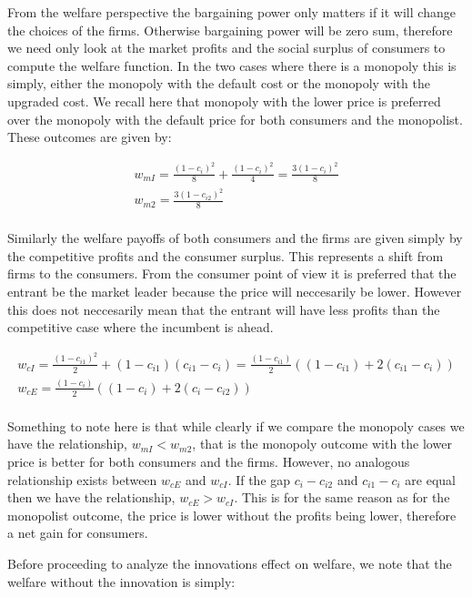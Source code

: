 \documentclass[11pt]{article}
\begin{document}
From the welfare perspective the bargaining power only matters if it will change the choices of the firms. Otherwise bargaining power will be zero sum, therefore we need only look at the market profits and the social surplus of consumers to compute the welfare function. In the two cases where there is a monopoly this is simply, either the monopoly with the default cost or the monopoly with the upgraded cost. We recall here that monopoly with the lower price is preferred over the monopoly with the default price for both consumers and the monopolist. These outcomes are given by:

\begin{align*}
w_{mI} = \frac{(1-c_i)^2}{8} + \frac{(1-c_i)^2}{4}= \frac{3(1-c_i)^2}{8} \\
w_{m2} = \frac{3(1-c_{i2})^2}{8} \\
\end{align*}

Similarly the welfare payoffs of both consumers and the firms are given simply by the competitive profits and the consumer surplus. This represents a shift from firms to the consumers. From the consumer point of view it is preferred that the entrant be the market leader because the price will neccesarily be lower. However this does not neccesarily mean that the entrant will have less profits than the competitive case where the incumbent is ahead. 

\begin{align*}
w_{cI} = \frac{(1-c_{i1})^2}{2} + (1-c_{i1})(c_{i1}-c_i)= \frac{(1-c_{i1})}{2} 
\left(
(1-c_{i1})+2(c_{i1}-c_i )
\right) \\
w_{cE} = \frac{(1-c_{i})}{2} 
\left(
(1-c_{i})+2(c_{i}-c_{i2} )
\right) \\
\end{align*}

Something to note here is that while clearly if we compare the monopoly cases we have the relationship, $w_{mI}<w_{m2}$, that is the monopoly outcome with the lower price is better for both consumers and the firms. However, no analogous relationship exists between $w_{cE}$ and $w_{cI}$. If the gap $c_i-c_{i2}$ and $c_{i1}-c_{i}$ are equal then we have the relationship, $w_{cE}>w_{cI}$. This is for the same reason as for the monopolist outcome, the price is lower without the profits being lower, therefore a net gain for consumers. 

Before proceeding to analyze the innovations effect on welfare, we note that the welfare without the innovation is simply:
\end{document}
